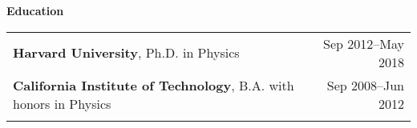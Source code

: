 \documentclass[letterpaper,11pt,oneside]{article}
\begin{document}
 \vspace{0.1cm}
\raggedright
\normalsize
\begin{flushleft}
 \textbf{\Large{Education}} \sout{\hfill} \\
\vspace{0.5cm}
\begin{tabular}{@{} l r@{}}
     \textbf{Harvard University}, Ph.D. in Physics & Sep 2012--May 2018 \\
     \textbf{California Institute of Technology}, B.A. with honors in  Physics & Sep 2008--Jun 2012\\
     \hspace{0.78\linewidth} & \hspace{0.1\linewidth} \\
\end{tabular}
\end{flushleft}




\clearpage
\end{document}
